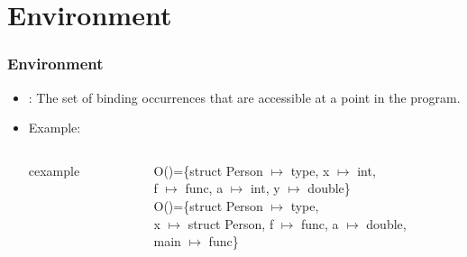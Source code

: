 \section{Environment}
\begin{frame}
 \frametitle{Environment}
\begin{itemize}[<+->]
 \item {}: The set of binding occurrences that are accessible at a
 point in the program.
\item Example: \\
\begin{columns}

\begin{column}{.45\linewidth}
\begin{beamercolorbox}{cexample}
 \codeenvC
\end{beamercolorbox}
\end{column}

\begin{column}{.55\linewidth}\small
\noindent
O()=\{struct Person $\mapsto$ type, x $\mapsto$ int,\\
f $\mapsto$ func, a $\mapsto$ int, y $\mapsto$ double\}\\[2em]
O()=\{struct Person $\mapsto$ type,\\
x $\mapsto$ struct Person, f $\mapsto$ func, a $\mapsto$ double,\\
main $\mapsto$ func\}\\
\end{column}
\end{columns}

\end{itemize}
\end{frame}

